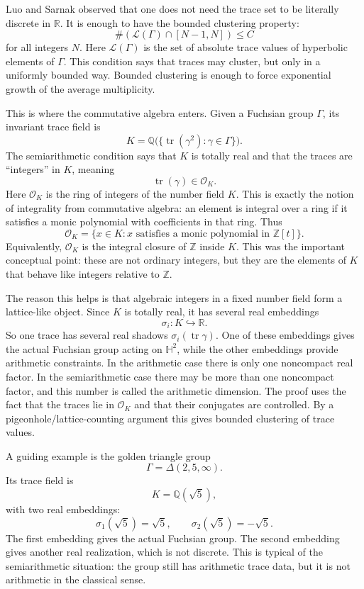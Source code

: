 \medskip\noindent
Luo and Sarnak observed that one does not
need the trace set to be literally discrete
in $\mathbb{R}$. It is enough to have the
bounded clustering property:
$$
\#(\mathcal{L}(\Gamma)\cap[N-1,N])
\leq C
$$
for all integers $N$. Here
$\mathcal{L}(\Gamma)$ is the set of absolute
trace values of hyperbolic elements of
$\Gamma$. This condition says that traces
may cluster, but only in a uniformly bounded
way. Bounded clustering is enough to force
exponential growth of the average
multiplicity.

\medskip\noindent
This is where the commutative algebra enters.
Given a Fuchsian group $\Gamma$, its invariant
trace field is
$$
K=
\mathbb{Q}
\bigl(\{\operatorname{tr}(\gamma^2):
\gamma\in\Gamma\}\bigr).
$$
The semiarithmetic condition says that $K$ is
totally real and that the traces are
``integers'' in $K$, meaning
$$
\operatorname{tr}(\gamma)\in\mathcal{O}_K.
$$
Here $\mathcal{O}_K$ is the ring of integers
of the number field $K$. This is exactly the
notion of integrality from commutative
algebra: an element is integral over a ring
if it satisfies a monic polynomial with
coefficients in that ring. Thus
$$
\mathcal{O}_K
=
\{x\in K:
x\text{ satisfies a monic polynomial in }
\mathbb{Z}[t]\}.
$$
Equivalently, $\mathcal{O}_K$ is the
integral closure of $\mathbb{Z}$ inside
$K$. This was the important conceptual point:
these are not ordinary integers, but they
are the elements of $K$ that behave like
integers relative to $\mathbb{Z}$.

\medskip\noindent
The reason this helps is that algebraic
integers in a fixed number field form a
lattice-like object. Since $K$ is totally
real, it has several real embeddings
$$
\sigma_i:K\hookrightarrow\mathbb{R}.
$$
So one trace has several real shadows
$\sigma_i(\operatorname{tr}\gamma)$. One of
these embeddings gives the actual Fuchsian
group acting on $\mathbb{H}^2$, while the
other embeddings provide arithmetic
constraints. In the arithmetic case there is
only one noncompact real factor. In the
semiarithmetic case there may be more than
one noncompact factor, and this number is
called the arithmetic dimension. The proof
uses the fact that the traces lie in
$\mathcal{O}_K$ and that their conjugates are
controlled. By a pigeonhole/lattice-counting
argument this gives bounded clustering of
trace values.

\medskip\noindent
A guiding example is the golden triangle
group
$$
\Gamma=\Delta(2,5,\infty).
$$
Its trace field is
$$
K=\mathbb{Q}(\sqrt{5}),
$$
with two real embeddings:
$$
\sigma_1(\sqrt{5})=\sqrt{5},
\qquad
\sigma_2(\sqrt{5})=-\sqrt{5}.
$$
The first embedding gives the actual
Fuchsian group. The second embedding gives
another real realization, which is not
discrete. This is typical of the
semiarithmetic situation: the group still has
arithmetic trace data, but it is not
arithmetic in the classical sense.

